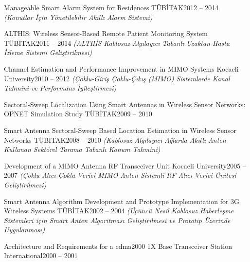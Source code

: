 \begin{cventries}
    {Manageable Smart Alarm System for Residences}
    {TÜBİTAK}{2012 -- 2014}
    {\textit{(Konutlar İçin Yönetilebilir Akıllı Alarm Sistemi)}}

    {ALTHIS: Wireless Sensor-Based Remote Patient Monitoring System}
    {TÜBİTAK}{2011 -- 2014}
    {\textit{(ALTHİS Kablosuz Algılayıcı Tabanlı Uzaktan Hasta İzleme Sistemi Geliştirilmesi)}}

    {Channel Estimation and Performance Improvement in MIMO Systems}
    {Kocaeli University}{2010 -- 2012}
    {\textit{(Çoklu-Giriş Çoklu-Çıkış (MIMO) Sistemlerde Kanal Tahmini ve Performans İyileştirmesi)}}

    {Sectoral-Sweep Localization Using Smart Antennas in Wireless Sensor Networks: OPNET Simulation Study}
    {TÜBİTAK}{2009 -- 2010}{}

    {Smart Antenna Sectoral-Sweep Based Location Estimation in Wireless Sensor Networks}
    {TÜBİTAK}{2008 -- 2010}
    {\textit{(Kablosuz Algılayıcı Ağlarda Akıllı Anten Kullanan Sektörel Tarama Tabanlı Konum Tahmini)}}

    {Development of a MIMO Antenna RF Transceiver Unit}
    {Kocaeli University}{2005 -- 2007}
    {\textit{(Çoklu Alıcı Çoklu Verici MIMO Anten Sistemli RF Alıcı Verici Ünitesi Geliştirilmesi)}}

    {Smart Antenna Algorithm Development and Prototype Implementation for 3G Wireless Systems}
    {TÜBİTAK}{2002 -- 2004}
    {\textit{(Üçüncü Nesil Kablosuz Haberleşme Sistemleri için Smart Anten Algoritması Geliştirilmesi ve Prototip Üzerinde Uygulanması)}}

    {Architecture and Requirements for a cdma2000 1X Base Transceiver Station}
    {International}{2000 -- 2001}{}
\end{cventries}
